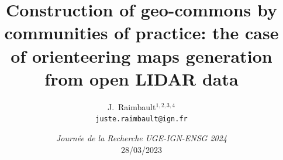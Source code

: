 \documentclass[english,11pt]{beamer}
\begin{document}
\title{Construction of geo-commons by communities of practice: the case of orienteering maps generation from open LIDAR data}

\author{J.~Raimbault$^{1,2,3,4}$\\
\texttt{juste.raimbault@ign.fr}
}




\date{\textit{Journ{\'e}e de la Recherche UGE-IGN-ENSG 2024}\\
28/03/2023
}





\frame{\maketitle}
\end{document}
